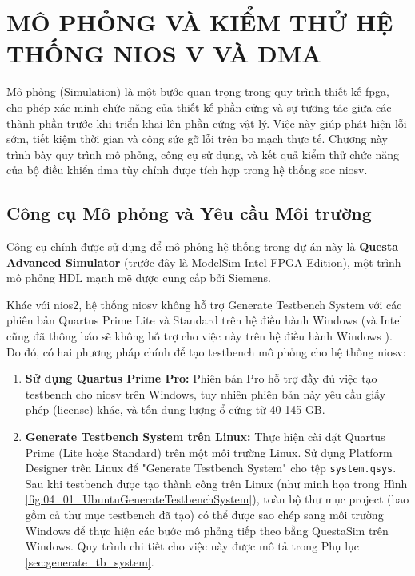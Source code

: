 \section{MÔ PHỎNG VÀ KIỂM THỬ HỆ THỐNG NIOS V VÀ DMA}
\label{sec:chapter4_content} %
Mô phỏng (Simulation) là một bước quan trọng trong quy trình thiết kế \acrshort{fpga}, cho phép xác minh chức năng của thiết kế phần cứng và sự tương tác giữa các thành phần trước khi triển khai lên phần cứng vật lý. Việc này giúp phát hiện lỗi sớm, tiết kiệm thời gian và công sức gỡ lỗi trên bo mạch thực tế. Chương này trình bày quy trình mô phỏng, công cụ sử dụng, và kết quả kiểm thử chức năng của bộ điều khiển \acrshort{dma} tùy chỉnh được tích hợp trong hệ thống \acrshort{soc} \acrlong{niosv}.
\subsection{Công cụ Mô phỏng và Yêu cầu Môi trường}

Công cụ chính được sử dụng để mô phỏng hệ thống trong dự án này là \textbf{Questa Advanced Simulator} (trước đây là ModelSim-Intel FPGA Edition), một trình mô phỏng HDL mạnh mẽ được cung cấp bởi Siemens.

Khác với \acrshort{nios2}, hệ thống \acrshort{niosv} không hỗ trợ Generate Testbench System với các phiên bản Quartus Prime Lite và Standard trên hệ điều hành Windows (và Intel cũng đã thông báo sẽ không hỗ trợ cho việc này trên hệ điều hành Windows \cite{intel-forum-simulation}). Do đó, có hai phương pháp chính để tạo testbench mô phỏng cho hệ thống \acrshort{niosv}:

\begin{enumerate}
    \item \textbf{Sử dụng Quartus Prime Pro:} Phiên bản Pro hỗ trợ đầy đủ việc tạo testbench cho \acrshort{niosv} trên Windows, tuy nhiên phiên bản này yêu cầu giấy phép (license) khác, và tốn dung lượng ổ cứng từ 40-145 GB.
    \item \textbf{Generate Testbench System trên Linux:} Thực hiện cài đặt Quartus Prime (Lite hoặc Standard) trên một môi trường Linux. Sử dụng Platform Designer trên Linux để "Generate Testbench System" cho tệp \texttt{system.qsys}. Sau khi testbench được tạo thành công trên Linux (như minh họa trong Hình \ref{fig:04_01_UbuntuGenerateTestbenchSystem}), toàn bộ thư mục project (bao gồm cả thư mục testbench đã tạo) có thể được sao chép sang môi trường Windows để thực hiện các bước mô phỏng tiếp theo bằng QuestaSim trên Windows. Quy trình chi tiết cho việc này được mô tả trong Phụ lục \ref{sec:generate_tb_system}.
\end{enumerate}

